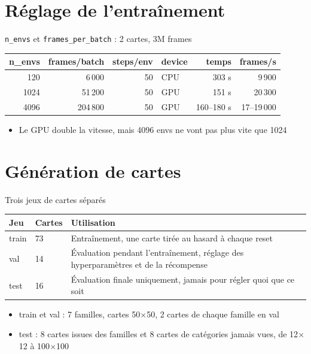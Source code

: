\documentclass[aspectratio=169,11pt]{beamer}
\begin{document}
\section{Réglage de l'entraînement}

\begin{frame}{\texttt{n\_envs} et \texttt{frames\_per\_batch} : 2 cartes, 3M frames}
  \centering
  \small
  \begin{tabular}{rrrlrr}
    \toprule
    n\_envs & frames/batch & steps/env & device & temps & frames/s \\
    \midrule
    120 & 6\,000 & 50 & CPU & 303 s & 9\,900 \\
    1024 & 51\,200 & 50 & GPU & 151 s & 20\,300 \\
    4096 & 204\,800 & 50 & GPU & 160--180 s & 17--19\,000 \\
    \bottomrule
  \end{tabular}

  \vspace{0.8em}
  \raggedright
  \normalsize
  \begin{itemize}
    \item Le GPU double la vitesse, mais 4096 envs ne vont pas plus vite que 1024
  \end{itemize}
\end{frame}

\section{Génération de cartes}

\begin{frame}{Trois jeux de cartes séparés}
  \centering
  \begin{tabular}{llp{8.2cm}}
    \toprule
    Jeu & Cartes & Utilisation \\
    \midrule
    train & 73 & Entraînement, une carte tirée au hasard à chaque reset \\
    val & 14 & Évaluation pendant l'entraînement, réglage des hyperparamètres et de la récompense \\
    test & 16 & Évaluation finale uniquement, jamais pour régler quoi que ce soit \\
    \bottomrule
  \end{tabular}

  \vspace{0.8em}
  \raggedright
  \begin{itemize}
    \item train et val : 7 familles, cartes 50$\times$50, 2 cartes de chaque famille en val
    \item test : 8 cartes issues des familles et 8 cartes de catégories jamais vues, de 12$\times$12 à 100$\times$100
  \end{itemize}
\end{frame}
\end{document}
